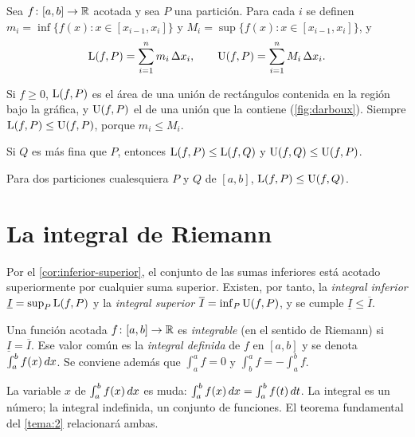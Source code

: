 \begin{definicion}\label{def:sumas}
Sea $f\colon[a,b]\to\mathbb{R}$ acotada y sea $P$ una partición. Para cada $i$ se definen
$m_i=\inf\{f(x):x\in[x_{i-1},x_i]\}$ y $M_i=\sup\{f(x):x\in[x_{i-1},x_i]\}$, y
\[
\operatorname{L}(f,P)=\sum_{i=1}^{n}m_i\,\Delta x_i,\qquad \operatorname{U}(f,P)=\sum_{i=1}^{n}M_i\,\Delta x_i .
\]
\end{definicion}

Si $f\ge0$, $\operatorname{L}(f,P)$ es el área de una unión de rectángulos contenida en la región bajo la gráfica, y $\operatorname{U}(f,P)$ el de una unión que la contiene (\cref{fig:darboux}). Siempre $\operatorname{L}(f,P)\le\operatorname{U}(f,P)$, porque $m_i\le M_i$.

\addtocounter{figure}{1}%

\begin{lema}[Refinamiento]\label{lem:refinamiento}
Si $Q$ es más fina que $P$, entonces $\operatorname{L}(f,P)\le\operatorname{L}(f,Q)$ y $\operatorname{U}(f,Q)\le\operatorname{U}(f,P)$.
\end{lema}

\begin{corolario}\label{cor:inferior-superior}
Para dos particiones cualesquiera $P$ y $Q$ de $[a,b]$, $\operatorname{L}(f,P)\le\operatorname{U}(f,Q)$.
\end{corolario}

\section{La integral de Riemann}

Por el \cref{cor:inferior-superior}, el conjunto de las sumas inferiores está acotado superiormente por cualquier suma superior. Existen, por tanto, la \emph{integral inferior} $\underline{I}=\sup_P\operatorname{L}(f,P)$ y la \emph{integral superior} $\overline{I}=\inf_P\operatorname{U}(f,P)$, y se cumple $\underline{I}\le\overline{I}$.

\begin{definicion}\label{def:integral}
Una función acotada $f\colon[a,b]\to\mathbb{R}$ es \emph{integrable} (en el sentido de Riemann) si $\underline{I}=\overline{I}$. Ese valor común es la \emph{integral definida} de $f$ en $[a,b]$ y se denota $\int_a^b f(x)\mathop{}\!d x$. Se conviene además que $\int_a^a f=0$ y $\int_b^a f=-\int_a^b f$.
\end{definicion}

La variable $x$ de $\int_a^b f(x)\mathop{}\!d x$ es muda: $\int_a^b f(x)\mathop{}\!d x=\int_a^b f(t)\mathop{}\!d t$. La integral es un número; la integral indefinida, un conjunto de funciones. El teorema fundamental del \cref{tema:2} relacionará ambas.


